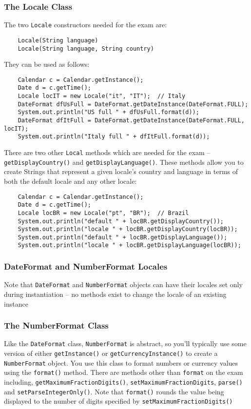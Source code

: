 \subsubsection{The Locale Class}
The two \verb#Locale# constructors needed for the exam are:
\begin{verbatim}
    Locale(String language)
    Locale(String language, String country)
\end{verbatim}
They can be used as follows:
\begin{verbatim}
    Calendar c = Calendar.getInstance();
    Date d = c.getTime();
    Locale locIT = new Locale("it", "IT");  // Italy
    DateFormat dfUsFull = DateFormat.getDateInstance(DateFormat.FULL);
    System.out.println("US full " + dfUsFull.format(d));
    DateFormat dfItFull = DateFormat.getDateInstance(DateFormat.FULL, locIT);
    System.out.println("Italy full " + dfItFull.format(d));
\end{verbatim}
There are two other \verb#Local# methods which are needed for the exam -- 
\verb#getDisplayCountry()# and \verb#getDisplayLanguage()#. These methods allow 
you to create Strings that represent a given locale's country and language in 
terms of both the default locale and any other locale:
\begin{verbatim}
    Calendar c = Calendar.getInstance();
    Date d = c.getTime();
    Locale locBR = new Locale("pt", "BR");  // Brazil
    System.out.println("default " + locBR.getDisplayCountry());
    System.out.println("locale " + locBR.getDisplayCountry(locBR));
    System.out.println("default " + locBR.getDisplayLanguage());
    System.out.println("locale " + locBR.getDisplayLanguage(locBR));
\end{verbatim}

\subsubsection{DateFormat and NumberFormat Locales}
Note that \verb#DateFormat# and \verb#NumberFormat# objects can have their 
locales set only during instantiation -- no methods exist to change the locale 
of an existing instance

\subsubsection{The NumberFormat Class}
Like the \verb#DateFormat# class, \verb#NumberFormat# is abstract, so you'll 
typically use some version of either \verb#getInstance()# or 
\verb#getCurrencyInstance()# to create a \verb#NumberFormat# object. You use 
this class to format numbers or currency values using the \verb#format()# 
method. There are methods other than \verb#format# on the exam including, 
\verb#getMaximumFractionDigits()#, \verb#setMaximumFractionDigits#, 
\verb#parse()# and \verb#setParseIntegerOnly()#. Note that \verb#format()# 
rounds the value being displayed to the number of digits specified by 
\verb#setMaximumFractionDigits()#

